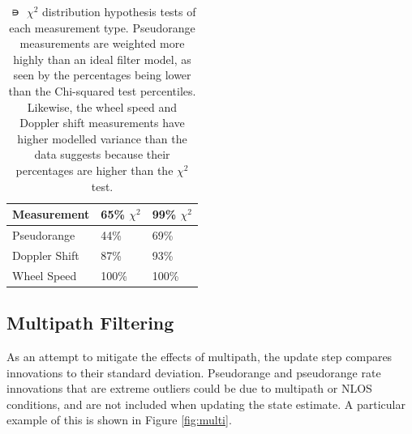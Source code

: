 \documentclass[letterpaper,times]{IONconf}
\begin{document}
\begin{table}
    \centering
    \begin{tabular}{l|l|l}
        Measurement & 65\% $\chi^2$ & 99\% $\chi^2$\\
        \hline\hline
        Pseudorange & 44\% & 69\% \\
        Doppler Shift & 87\% & 93\% \\
        Wheel Speed & 100\% & 100\%
    \end{tabular}
    \caption{$\nis$ $\chi^2$ distribution hypothesis tests of each measurement type. Pseudorange measurements are weighted more highly than an ideal filter model, as seen by the percentages being lower than the Chi-squared test percentiles. Likewise, the wheel speed and Doppler shift measurements have higher modelled variance than the data suggests because their percentages are higher than the $\chi^2$ test.}\label{tab:nis}
\end{table}

\subsection{Multipath Filtering}

As an attempt to mitigate the effects of multipath, the update step compares innovations to their standard deviation. Pseudorange and pseudorange rate innovations that are extreme outliers could be due to multipath or NLOS conditions, and are not included when updating the state estimate. A particular example of this is shown in Figure \ref{fig:multi}. 
\end{document}
